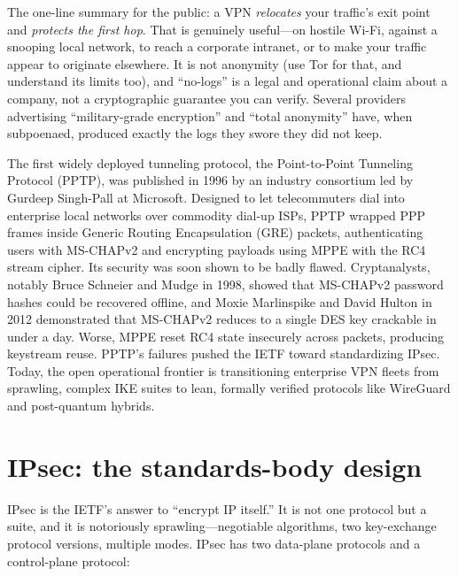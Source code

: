 \begin{applicationbox}
The one-line summary for the public: a VPN \emph{relocates} your traffic's exit point and \emph{protects the first hop}. That is genuinely useful---on hostile Wi-Fi, against a snooping local network, to reach a corporate intranet, or to make your traffic appear to originate elsewhere. It is not anonymity (use Tor for that, and understand its limits too), and ``no-logs'' is a legal and operational claim about a company, not a cryptographic guarantee you can verify. Several providers advertising ``military-grade encryption'' and ``total anonymity'' have, when subpoenaed, produced exactly the logs they swore they did not keep.
\end{applicationbox}

\begin{historybox}
The first widely deployed tunneling protocol, the Point-to-Point Tunneling Protocol (PPTP), was published in 1996 by an industry consortium led by Gurdeep Singh-Pall at Microsoft. Designed to let telecommuters dial into enterprise local networks over commodity dial-up ISPs, PPTP wrapped PPP frames inside Generic Routing Encapsulation (GRE) packets, authenticating users with MS-CHAPv2 and encrypting payloads using MPPE with the RC4 stream cipher. Its security was soon shown to be badly flawed. Cryptanalysts, notably Bruce Schneier and Mudge in 1998, showed that MS-CHAPv2 password hashes could be recovered offline, and Moxie Marlinspike and David Hulton in 2012 demonstrated that MS-CHAPv2 reduces to a single DES key crackable in under a day. Worse, MPPE reset RC4 state insecurely across packets, producing keystream reuse. PPTP's failures pushed the IETF toward standardizing IPsec. Today, the open operational frontier is transitioning enterprise VPN fleets from sprawling, complex IKE suites to lean, formally verified protocols like WireGuard and post-quantum hybrids.
\end{historybox}

\section{IPsec: the standards-body design}
\label{ch30:ipsec}

IPsec is the IETF's answer to ``encrypt IP itself.'' It is not one protocol but a suite, and it is notoriously sprawling---negotiable algorithms, two key-exchange protocol versions, multiple modes. 
IPsec has two data-plane protocols and a control-plane protocol:


